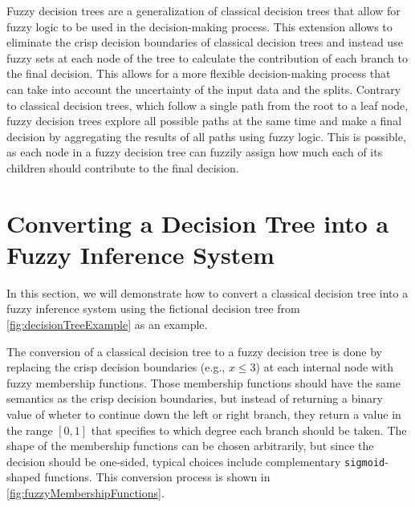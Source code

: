 Fuzzy decision trees are a generalization of classical decision trees that allow for fuzzy logic to be used in the decision-making process. This extension allows to eliminate the crisp decision boundaries of classical decision trees and instead use fuzzy sets at each node of the tree to calculate the contribution of each branch to the final decision. This allows for a more flexible decision-making process that can take into account the uncertainty of the input data and the splits. Contrary to classical decision trees, which follow a single path from the root to a leaf node, fuzzy decision trees explore all possible paths at the same time and make a final decision by aggregating the results of all paths using fuzzy logic. This is possible, as each node in a fuzzy decision tree can fuzzily assign how much each of its children should contribute to the final decision.

\section{Converting a Decision Tree into a Fuzzy Inference System}


In this section, we will demonstrate how to convert a classical decision tree into a fuzzy inference system using the fictional decision tree from \autoref{fig:decisionTreeExample} as an example.

The conversion of a classical decision tree to a fuzzy decision tree is done by replacing the crisp decision boundaries (e.g., $x \leq 3$) at each internal node with fuzzy membership functions. Those membership functions should have the same semantics as the crisp decision boundaries, but instead of returning a binary value of wheter to continue down the left or right branch, they return a value in the range $[0,1]$ that specifies to which degree each branch should be taken. The shape of the membership functions can be chosen arbitrarily, but since the decision should be one-sided, typical choices include complementary \texttt{sigmoid}-shaped functions. This conversion process is shown in \autoref{fig:fuzzyMembershipFunctions}.


